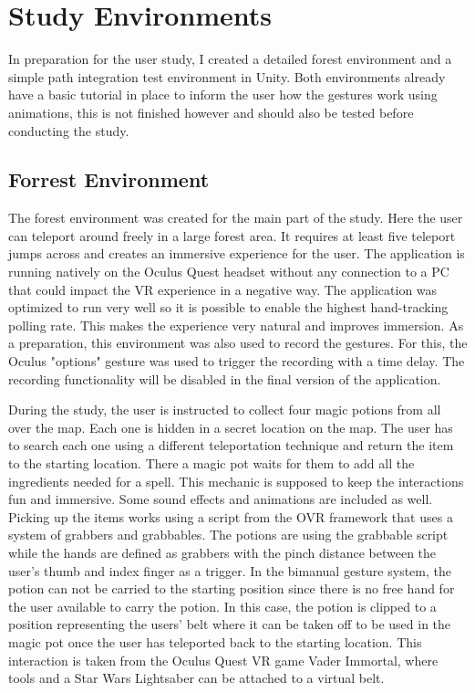 
\chapter{Study Environments}
In preparation for the user study, I created a detailed forest environment and a simple path integration test environment in Unity. Both environments already have a basic tutorial in place to inform the user how the gestures work using animations, this is not finished however and should also be tested before conducting the study.


\section{Forrest Environment}
The forest environment was created for the main part of the study. Here the user can teleport around freely in a large forest area. It requires at least five teleport jumps across and creates an immersive experience for the user. The application is running natively on the Oculus Quest headset without any connection to a PC that could impact the VR experience in a negative way. The application was optimized to run very well so it is possible to enable the highest hand-tracking polling rate. This makes the experience very natural and improves immersion. As a preparation, this environment was also used to record the gestures. For this, the Oculus "options" gesture was used to trigger the recording with a time delay. The recording functionality will be disabled in the final version of the application. %

During the study, the user is instructed to collect four magic potions from all over the map. Each one is hidden in a secret location on the map. The user has to search each one using a different teleportation technique and return the item to the starting location. There a magic pot waits for them to add all the ingredients needed for a spell. This mechanic is supposed to keep the interactions fun and immersive. Some sound effects and animations are included as well. Picking up the items works using a script from the OVR framework that uses a system of grabbers and grabbables. The potions are using the grabbable script while the hands are defined as grabbers with the pinch distance between the user's thumb and index finger as a trigger. In the bimanual gesture system, the potion can not be carried to the starting position since there is no free hand for the user available to carry the potion. In this case, the potion is clipped to a position representing the users' belt where it can be taken off to be used in the magic pot once the user has teleported back to the starting location. This interaction is taken from the Oculus Quest VR game Vader Immortal, where tools and a Star Wars Lightsaber can be attached to a virtual belt. 


